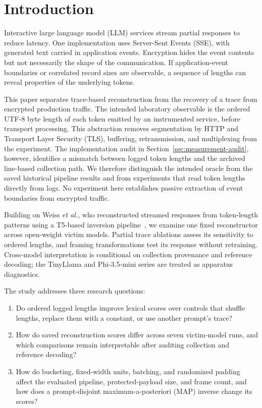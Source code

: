 \documentclass[electronics,article,submit,pdftex,moreauthors]{Definitions/mdpi}
\begin{document}
\section{Introduction}
Interactive large language model (LLM) services stream partial responses to reduce latency. One implementation uses Server-Sent Events (SSE), with generated text carried in application events. Encryption hides the event contents but not necessarily the shape of the communication. If application-event boundaries or correlated record sizes are observable, a sequence of lengths can reveal properties of the underlying tokens.

This paper separates trace-based reconstruction from the recovery of a trace from encrypted production traffic. The intended laboratory observable is the ordered UTF-8 byte length of each token emitted by an instrumented service, before transport processing. This abstraction removes segmentation by HTTP and Transport Layer Security (TLS), buffering, retransmission, and multiplexing from the experiment. The implementation audit in Section~\ref{sec:measurement-audit}, however, identifies a mismatch between logged token lengths and the archived line-based collection path. We therefore distinguish the intended oracle from the saved historical pipeline results and from experiments that read token lengths directly from logs. No experiment here establishes passive extraction of event boundaries from encrypted traffic.

Building on Weiss \emph{et al.}, who reconstructed streamed responses from token-length patterns using a T5-based inversion pipeline~\cite{weiss2024prompt}, we examine one fixed reconstructor across open-weight victim models. Partial trace ablations assess its sensitivity to ordered lengths, and framing transformations test its response without retraining. Cross-model interpretation is conditional on collection provenance and reference decoding; the TinyLlama and Phi-3.5-mini series are treated as apparatus diagnostics.

The study addresses three research questions:
\begin{enumerate}[label=\textbf{RQ\arabic*:},leftmargin=4.2em,labelwidth=3.2em,labelsep=0.6em]
    \item Do ordered logged lengths improve lexical scores over controls that shuffle lengths, replace them with a constant, or use another prompt's trace?
    \item How do saved reconstruction scores differ across seven victim-model runs, and which comparisons remain interpretable after auditing collection and reference decoding?
    \item How do bucketing, fixed-width units, batching, and randomized padding affect the evaluated pipeline, protected-payload size, and frame count, and how does a prompt-disjoint maximum-a-posteriori (MAP) inverse change its scores?
\end{enumerate}
\end{document}
